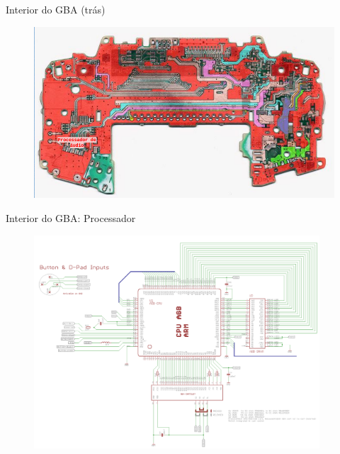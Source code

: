 \documentclass{beamer}
\begin{document}
\begin{darkframes}
    \begin{frame}{Interior do GBA (trás)}
        \begin{figure}[h!]
            \centering
            \includegraphics[width=1\textwidth,height=1\textheight,keepaspectratio]{gba_inside_back}
        \end{figure}
    \end{frame}

    \begin{frame}{Interior do GBA: Processador}
        \begin{figure}[h!]
            \centering
            \includegraphics[width=0.95\textwidth,height=0.95\textheight,keepaspectratio]{gba_processor}
        \end{figure}
    \end{frame}


\end{darkframes}
\end{document}
